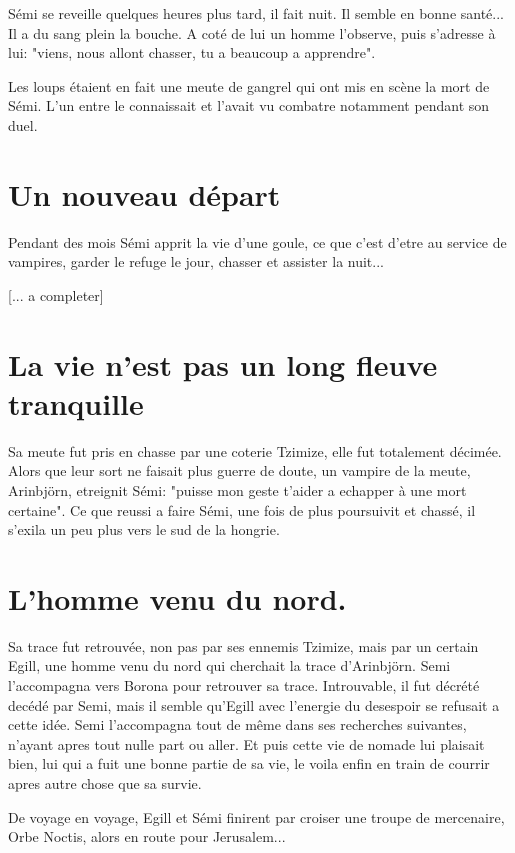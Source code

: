 Sémi se reveille quelques heures plus tard, il fait nuit. Il semble en bonne santé...
Il a du sang plein la bouche. A coté de lui un homme l'observe, puis s'adresse à lui: 
"viens, nous allont chasser, tu a beaucoup a apprendre".

\begin{quotebox}
Les loups étaient en fait une meute de gangrel qui ont mis
en scène la mort de Sémi.
L'un entre le connaissait et l'avait vu combatre notamment pendant son duel.
\end{quotebox}

\section{Un nouveau départ}

Pendant des mois Sémi apprit
la vie d'une goule, ce que c'est d'etre au service de vampires, garder le refuge le jour,
chasser et assister la nuit...

[... a completer]

\section{La vie n'est pas un long fleuve tranquille}
Sa meute fut pris en chasse par une coterie Tzimize, elle fut totalement décimée. Alors que leur sort ne faisait plus guerre de doute, un vampire de la meute, Arinbjörn, etreignit Sémi: "puisse mon geste t'aider a echapper à une mort certaine". Ce que reussi a faire Sémi, une fois de plus poursuivit et chassé, il s'exila un peu plus vers le sud de la hongrie.

\section{L'homme venu du nord.}
Sa trace fut retrouvée, non pas par ses ennemis Tzimize, mais par un certain Egill, une homme venu du nord qui cherchait la trace d'Arinbjörn. Semi l'accompagna vers Borona  pour retrouver sa trace. Introuvable, il fut décrété decédé par Semi, mais il semble qu'Egill avec l'energie du desespoir se refusait a cette idée. Semi l'accompagna tout de même dans ses recherches suivantes, n'ayant apres tout nulle part ou aller. Et puis cette vie de nomade lui plaisait bien, lui qui a fuit une bonne partie de sa vie, le voila enfin en train de courrir apres autre chose que sa survie.

De voyage en voyage, Egill et Sémi finirent par croiser une troupe de mercenaire, Orbe Noctis, alors en route pour Jerusalem...


